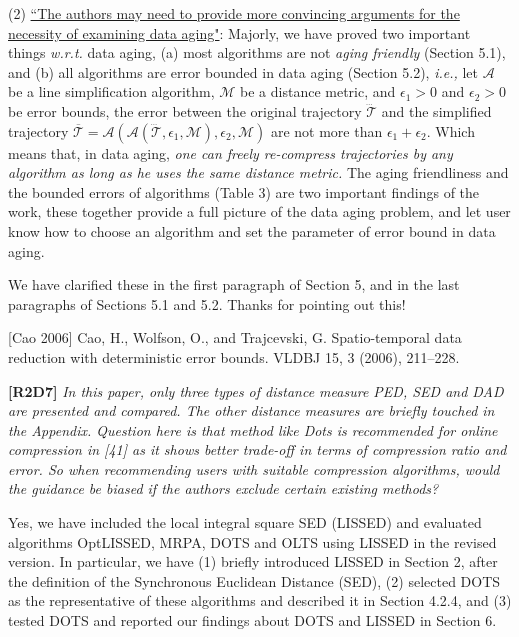 \documentclass{letter}
\newcommand{\ie}{\emph{i.e.,}\xspace}
\newcommand{\wrt}{\emph{w.r.t.}\xspace}
\begin{document}
{{(2) \underline{``The authors may need to provide more convincing arguments for the necessity of examining data aging"}: Majorly, we have proved two important things \wrt data aging, (a) most algorithms are not \emph{aging friendly} (Section 5.1), and (b) all algorithms are error bounded in data aging (Section 5.2), \ie let $\mathcal{A}$ be a line simplification algorithm,  $\mathcal{M}$ be a distance metric, and $\epsilon_1>0$ and $\epsilon_2>0$ be error bounds, the error between the original trajectory $\dddot{\mathcal{T}}$ and the simplified trajectory $\overline{\mathcal{T}}=\mathcal{A}(\mathcal{A}(\dddot{\mathcal{T}}, \epsilon_1, \mathcal{M}), \epsilon_2, \mathcal{M})$ are not more than $\epsilon_1+ \epsilon_2$. Which means that, in data aging, \emph{one can freely re-compress trajectories by any algorithm as long as he uses the same distance metric.} The aging friendliness and the bounded errors of algorithms (Table 3) are two important findings of the work, these together provide a full picture of the data aging problem, and let user know how to choose an algorithm and set the parameter of error bound in data aging. 

We have clarified these in the first paragraph of Section 5, and in the last paragraphs of Sections 5.1 and 5.2. Thanks for pointing out this!

[Cao 2006] Cao, H., Wolfson, O., and Trajcevski, G. Spatio-temporal data reduction with deterministic error bounds. VLDBJ 15, 3 (2006), 211–228.


\textbf{[R2D7]} \emph{In this paper, only three types of distance measure PED, SED and DAD are presented and compared. The other distance measures are briefly touched in the Appendix. Question here is that method like Dots is recommended for online compression in [41] as it shows better trade-off in terms of compression ratio and error. So when recommending users with suitable compression algorithms, would the guidance be biased if the authors exclude certain existing methods?}

Yes, we have included the local integral square SED (LISSED) and evaluated algorithms OptLISSED, MRPA, DOTS and OLTS using LISSED in the revised version. In particular, we have (1) briefly introduced LISSED in Section 2, after the definition of the Synchronous Euclidean Distance (SED), (2) selected DOTS as the representative of these algorithms and described it in Section 4.2.4, and (3) tested DOTS and reported our findings about DOTS and LISSED in Section 6.

}}
\end{document}
